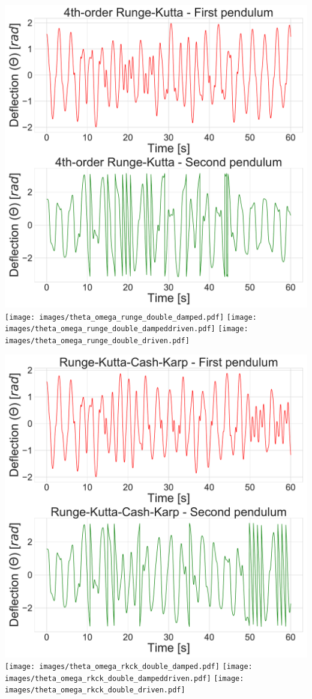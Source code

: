 \begin{multicols}{4}
{\centering\includegraphics[width=.25\textwidth]{images/theta_omega_runge_double.pdf}}
\label{fig:52}
\hfill
{\centering\texttt{[image: images/theta\_omega\_runge\_double\_damped.pdf]}}
\label{fig:53}
\hfill
{\centering\texttt{[image: images/theta\_omega\_runge\_double\_dampeddriven.pdf]}}
\label{fig:54}
\hfill
{\centering\texttt{[image: images/theta\_omega\_runge\_double\_driven.pdf]}}
\label{fig:55}
\hfill

\end{multicols}
\begin{multicols}{4}

{\centering\includegraphics[width=.25\textwidth]{images/theta_omega_rkck_double.pdf}}
\label{fig:56}
\hfill
{\centering\texttt{[image: images/theta\_omega\_rkck\_double\_damped.pdf]}}
\label{fig:57}
\hfill
{\centering\texttt{[image: images/theta\_omega\_rkck\_double\_dampeddriven.pdf]}}
\label{fig:58}
\hfill
{\centering\texttt{[image: images/theta\_omega\_rkck\_double\_driven.pdf]}}
\label{fig:59}
\hfill

\end{multicols}
